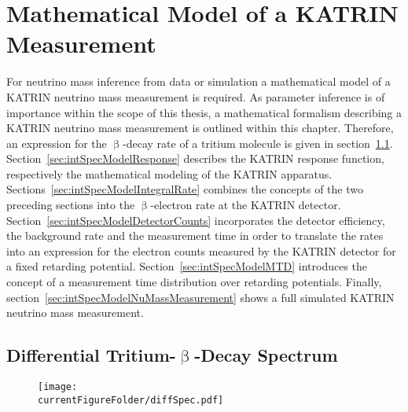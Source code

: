 \def\currentRootFolder{chapter/modelOfIntegratedRate}
\def\currentFigureFolder{\currentRootFolder/fig}



\chapter{Mathematical Model of a KATRIN Measurement}
\label{sec:intSpecModel}
For neutrino mass inference from data or simulation a mathematical model of a KATRIN neutrino mass measurement is required. As parameter inference is of importance within the scope of this thesis, a mathematical formalism describing a KATRIN neutrino mass measurement is outlined within this chapter. Therefore, an expression for the $\upbeta$-decay rate of a tritium molecule is given in section~\ref{sec:intSpecModelDiffSpec}. Section~\ref{sec:intSpecModelResponse} describes the KATRIN response function, respectively the mathematical modeling of the KATRIN apparatus. Sections~\ref{sec:intSpecModelIntegralRate} combines the concepts of the two preceding sections into the $\upbeta$-electron rate at the KATRIN detector. Section~\ref{sec:intSpecModelDetectorCounts} incorporates the detector efficiency, the background rate and the measurement time in order to translate the rates into an expression for the electron counts measured by the KATRIN detector for a fixed retarding potential. Section~\ref{sec:intSpecModelMTD} introduces the concept of a measurement time distribution over retarding potentials. Finally, section~\ref{sec:intSpecModelNuMassMeasurement} shows a full simulated KATRIN neutrino mass measurement.

\section{Differential Tritium-\texorpdfstring{$\upbeta$}{Beta}-Decay Spectrum}
\label{sec:intSpecModelDiffSpec}
\begin{figure}
	\centering
	\texttt{[image: \\currentFigureFolder/diffSpec.pdf]}
	\label{fig:intSpecModelDiffSpec}
\end{figure}



